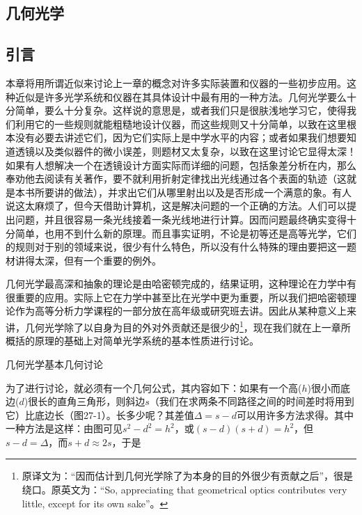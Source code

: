 \documentclass[12pt,oneside]{book}
\begin{document}
\begin{common-format}
\mainmatter

\setcounter{chapter}{26}
\chapter{几何光学}

\section{引言}
本章将用所谓近似来讨论上一章的概念对许多实际装置和仪器的一些初步应用。这种近似是许多光学系统和仪器在其具体设计中最有用的一种方法。几何光学要么十分简单，要么十分复杂。这样说的意思是，或者我们只是很肤浅地学习它，使得我们利用它的一些规则就能粗糙地设计仪器，而这些规则又十分简单，以致在这里根本没有必要去讲述它们，因为它们实际上是中学水平的内容；或者如果我们想要知道透镜以及类似器件的微小误差，则题材又太复杂，以致在这里讨论它显得太深！如果有人想解决一个在透镜设计方面实际而详细的问题，包括象差分析在内，那么奉劝他去阅读有关著作，要不就利用折射定律找出光线通过各个表面的轨迹（这就是本书所要讲的做法），并求出它们从哪里射出以及是否形成一个满意的象。有人说这太麻烦了，但今天借助计算机，这是解决问题的一个正确的方法。人们可以提出问题，并且很容易一条光线接着一条光线地进行计算。因而问题最终确实变得十分简单，也用不到什么新的原理。而且事实证明，不论是初等还是高等光学，它们的规则对于别的领域来说，很少有什么特色，所以没有什么特殊的理由要把这一题材讲得太深，但有一个重要的例外。

几何光学最高深和抽象的理论是由哈密顿完成的，结果证明，这种理论在力学中有很重要的应用。实际上它在力学中甚至比在光学中更为重要，所以我们把哈密顿理论作为高等分析力学课程的一部分放在高年级或研究班去讲。因此从某种意义上来讲，几何光学除了以自身为目的外对外贡献还是很少的\footnote{原译文为：“因而估计到几何光学除了为本身的目的外很少有贡献之后”，很是绕口。原英文为：“So, appreciating that geometrical optics contributes very little, except for its own sake”。}，现在我们就在上一章所概括的原理的基础上对简单光学系统的基本性质进行讨论。

\begin{fig}{几何光学基本几何讨论}
\label{fig:几何光学基本几何讨论}
\end{fig}

为了进行讨论，就必须有一个几何公式，其内容如下：如果有一个高($ h $)很小而底边($ d $)很长的直角三角形，则斜边$ s $（我们在求两条不同路径之间的时间差时将用到它）比底边长（图27-1）。长多少呢？其差值$ \Delta = s - d $可以用许多方法求得。其中一种方法是这样：由图可见$ s^2 - d^2 = h^2 $，或$ (s - d)(s + d) = h^2 $，但 $ s - d = \Delta $，而$ s + d \approx 2s $，于是


\end{common-format}
\end{document}
